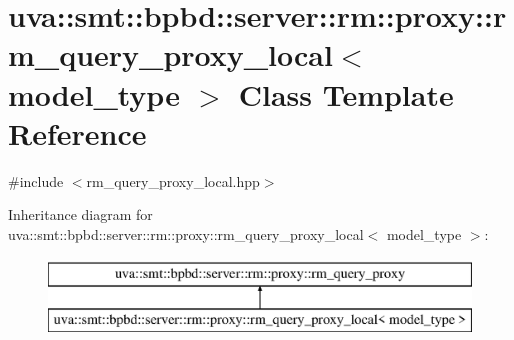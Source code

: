 \hypertarget{classuva_1_1smt_1_1bpbd_1_1server_1_1rm_1_1proxy_1_1rm__query__proxy__local}{}\section{uva\+:\+:smt\+:\+:bpbd\+:\+:server\+:\+:rm\+:\+:proxy\+:\+:rm\+\_\+query\+\_\+proxy\+\_\+local$<$ model\+\_\+type $>$ Class Template Reference}
\label{classuva_1_1smt_1_1bpbd_1_1server_1_1rm_1_1proxy_1_1rm__query__proxy__local}


{\ttfamily \#include $<$rm\+\_\+query\+\_\+proxy\+\_\+local.\+hpp$>$}

Inheritance diagram for uva\+:\+:smt\+:\+:bpbd\+:\+:server\+:\+:rm\+:\+:proxy\+:\+:rm\+\_\+query\+\_\+proxy\+\_\+local$<$ model\+\_\+type $>$\+:\begin{figure}[H]
\begin{center}
\leavevmode
\includegraphics[height=2.000000cm]{classuva_1_1smt_1_1bpbd_1_1server_1_1rm_1_1proxy_1_1rm__query__proxy__local}
\end{center}
\end{figure}
